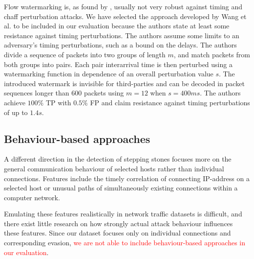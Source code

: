 \documentclass[conference]{IEEEtran}\usepackage[]{graphicx}\usepackage[]{color}
\begin{document}
Flow watermarking is, as found by \cite{iacovazzi2016network}, usually not very robust against timing and chaff perturbation attacks. We have selected the approach developed by Wang et al. \cite{wang2010robust} to be included in our evaluation because the authors state at least some resistance against timing perturbations. The authors assume some limits to an adversary's  timing perturbations, such as a bound on the delays. The authors divide a sequence of packets into two groups of length $m$, and match packets from both groups into pairs. Each pair interarrival time is then perturbed using a watermarking function in dependence of an overall perturbation value $s$. 
The introduced watermark is invisible for third-parties and can be decoded in packet sequences longer than 600 packets using $m=12$ when $s=400ms$.  The authors achieve $100\%$ TP with $0.5\%$ FP and claim resistance against timing perturbations of up to $1.4s$.




\subsection{Behaviour-based approaches}

A different direction in the detection of stepping stones focuses more on the general communication behaviour of selected hosts rather than individual connections. Features include the timely correlation of connecting IP-address on a selected host or unusual paths of simultaneously existing connections within a computer network.

Emulating these features realistically in network traffic datasets is difficult, and there exist little research on how strongly actual attack behaviour influences these features. Since our dataset focuses only on individual connections and corresponding evasion, \textcolor{red}{we are not able to include behaviour-based approaches in our evaluation}.
\end{document}
